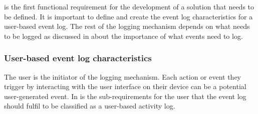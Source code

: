 is the first functional requirement for the development of a solution that needs to be defined. It is important to define and create the event log characteristics for a user-based event log. The rest of the logging mechanism depends on what needs to be logged as discussed in  about the importance of what events need to log. 

\subsubsection{User-based event log characteristics}\label{sec:ch2_requirementsOfUAT}
The user is the initiator of the logging mechanism. Each action or event they trigger by interacting with the user interface on their device can be a potential user-generated event. In  is the sub-requirements for the user that the event log should fulfil to be classified as a user-based activity log.

\clearpage

